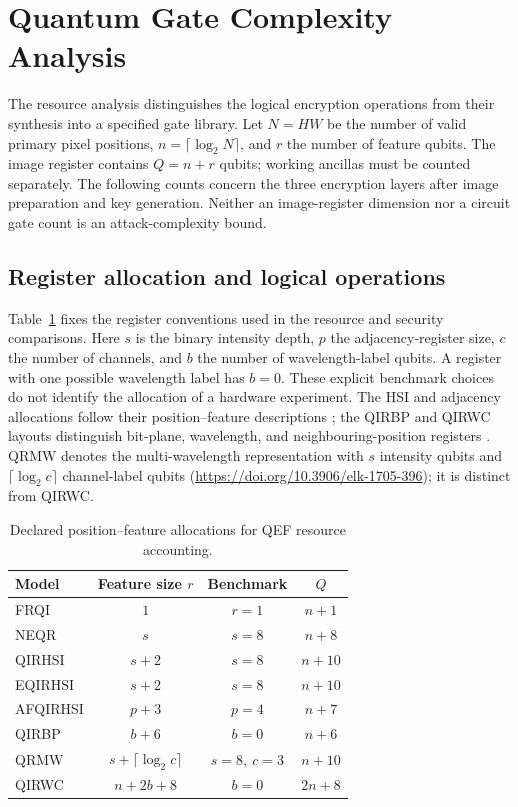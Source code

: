 {\color{red}
\section{Quantum Gate Complexity Analysis}
\label{section:7}

The resource analysis distinguishes the logical encryption operations from
their synthesis into a specified gate library. Let $N=HW$ be the number of
valid primary pixel positions, $n=\lceil\log_2N\rceil$, and $r$ the number
of feature qubits. The image register contains $Q=n+r$ qubits; working
ancillas must be counted separately. The following counts concern the
three encryption layers after image preparation and key generation.
Neither an image-register dimension nor a circuit gate count is an
attack-complexity bound.

\subsection{Register allocation and logical operations}

Table~\ref{tab:1} fixes the register conventions used in the resource and
security comparisons. Here $s$ is the binary intensity depth, $p$ the
adjacency-register size, $c$ the number of channels, and $b$ the number of
wavelength-label qubits. A register with one possible wavelength label has
$b=0$. These explicit benchmark choices do not identify the allocation
of a hardware experiment. The HSI and adjacency allocations follow their
position--feature descriptions
\cite{QIRHSI,EQIRHSI,AFQIRHSI}; the QIRBP and QIRWC layouts distinguish
bit-plane, wavelength, and neighbouring-position registers
\cite{QIRBPQIRWC}. QRMW denotes the multi-wavelength representation with
$s$ intensity qubits and $\lceil\log_2c\rceil$ channel-label qubits
(\url{https://doi.org/10.3906/elk-1705-396}); it is distinct from QIRWC.

\begin{table}[htbp]
\centering
\color{red}
\caption{{\color{red}Declared position--feature allocations for QEF resource accounting.}}
\label{tab:1}
\small
\renewcommand{\arraystretch}{1.15}
\begin{tabular}{|l|c|c|c|}
\hline
\rowcolor{Bisque3}
\textbf{Model} & \textbf{Feature size $r$} & \textbf{Benchmark} & \textbf{$Q$} \\
\hline
FRQI & $1$ & $r=1$ & $n+1$ \\\hline
NEQR & $s$ & $s=8$ & $n+8$ \\\hline
QIRHSI & $s+2$ & $s=8$ & $n+10$ \\\hline
EQIRHSI & $s+2$ & $s=8$ & $n+10$ \\\hline
AFQIRHSI & $p+3$ & $p=4$ & $n+7$ \\\hline
QIRBP & $b+6$ & $b=0$ & $n+6$ \\\hline
QRMW & $s+\lceil\log_2c\rceil$ & $s=8,\ c=3$ & $n+10$ \\\hline
QIRWC & $n+2b+8$ & $b=0$ & $2n+8$ \\\hline
\end{tabular}
\end{table}

}
